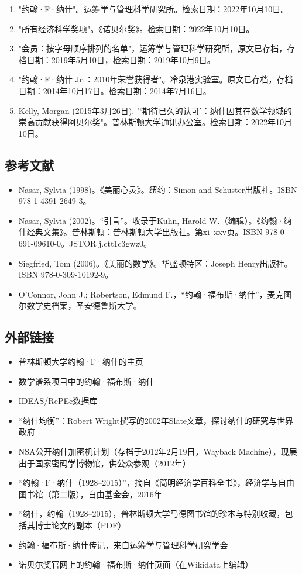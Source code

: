 \begin{enumerate}
\item "约翰·F·纳什"。运筹学与管理科学研究所。检索日期：2022年10月10日。
\item "所有经济科学奖项"。《诺贝尔奖》。检索日期：2022年10月10日。
\item "会员：按字母顺序排列的名单"，运筹学与管理科学研究所，原文已存档，存档日期：2019年5月10日，检索日期：2019年10月9日。
\item "约翰·F·纳什 Jr.：2010年荣誉获得者"。冷泉港实验室。原文已存档，存档日期：2014年10月17日。检索日期：2014年7月16日。
\item Kelly, Morgan (2015年3月26日). "‘期待已久的认可’：纳什因其在数学领域的崇高贡献获得阿贝尔奖"。普林斯顿大学通讯办公室。检索日期：2022年10月10日。
\end{enumerate}
\subsection{参考文献}  
\begin{itemize}
\item Nasar, Sylvia (1998)。《美丽心灵》。纽约：Simon and Schuster出版社。ISBN 978-1-4391-2649-3。  
\item Nasar, Sylvia (2002)。“引言”。收录于Kuhn, Harold W.（编辑）。《约翰·纳什经典文集》。普林斯顿：普林斯顿大学出版社。第xi–xxv页。ISBN 978-0-691-09610-0。JSTOR j.ctt1c3gwz0。  
\item Siegfried, Tom (2006)。《美丽的数学》。华盛顿特区：Joseph Henry出版社。ISBN 978-0-309-10192-9。  
\item O'Connor, John J.; Robertson, Edmund F.，“约翰·福布斯·纳什”，麦克图尔数学史档案，圣安德鲁斯大学。 
\end{itemize} 
\subsection{外部链接}
\begin{itemize}
\item 普林斯顿大学约翰·F·纳什的主页  
\item 数学谱系项目中的约翰·福布斯·纳什  
\item IDEAS/RePEc数据库  
\item “纳什均衡”：Robert Wright撰写的2002年Slate文章，探讨纳什的研究与世界政府  
\item NSA公开纳什加密机计划（存档于2012年2月19日，Wayback Machine），现展出于国家密码学博物馆，供公众参观（2012年）  
\item “约翰·F·纳什（1928–2015）”，摘自《简明经济学百科全书》，经济学与自由图书馆（第二版），自由基金会，2016年  
\item “纳什，约翰（1928–2015），普林斯顿大学马德图书馆的珍本与特别收藏，包括其博士论文的副本（PDF）  
\item 约翰·福布斯·纳什传记，来自运筹学与管理科学研究学会  
\item 诺贝尔奖官网上的约翰·福布斯·纳什页面（在Wikidata上编辑）  
\end{itemize}